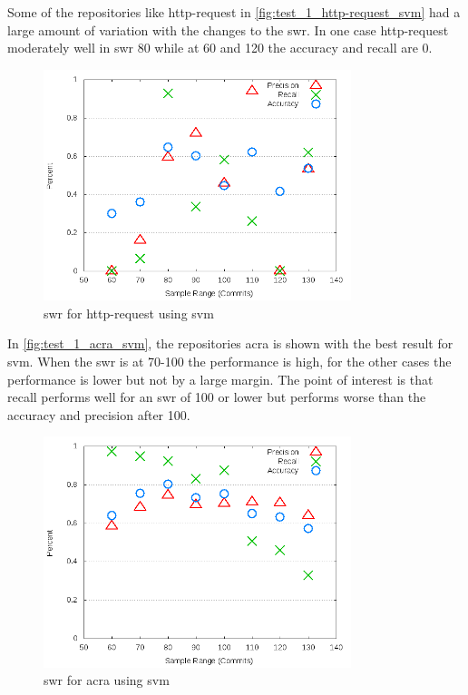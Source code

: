 Some of the repositories like http-request in \autoref{fig:test_1_http-request_svm} had a large amount of variation with the changes to the \gls{swr}. In one case http-request moderately well in \gls{swr} 80 while at 60 and 120 the accuracy and recall are $0$.

\begin{figure}[!ht]
    \centering

        \includegraphics[width=0.8\textwidth]{images/svm/test_1/http-request_sample_range}
        \caption{\gls{swr} for http-request using \gls{svm}}
        \label{fig:test_1_http-request_svm}
\end{figure}

In \autoref{fig:test_1_acra_svm}, the repositories acra is shown with the best result for \gls{svm}. When the \gls{swr} is at 70-100 the performance is high, for the other cases the performance is lower but not by a large margin. The point of interest is that recall performs well for an \gls{swr} of 100 or lower but performs worse than the accuracy and precision after 100.

\begin{figure}[!ht]
    \centering

        \includegraphics[width=0.8\textwidth]{images/svm/test_1/acra_sample_range}
        \caption{\gls{swr} for acra using \gls{svm}}
        \label{fig:test_1_acra_svm}
\end{figure}

